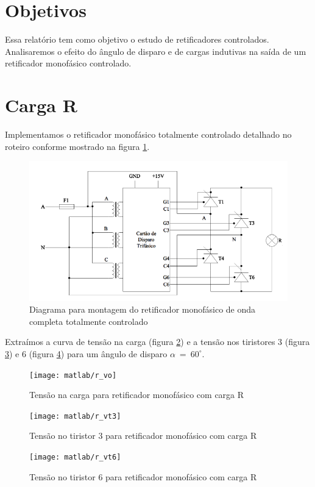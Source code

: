 \documentclass{report}
\begin{document}


\onehalfspacing
\section{Objetivos}
	Essa relatório tem como objetivo o estudo de retificadores controlados. Analisaremos o efeito do ângulo de disparo e de cargas indutivas na saída de um retificador monofásico controlado.
	 
\section{Carga R}
Implementamos o retificador monofásico totalmente controlado detalhado no roteiro conforme mostrado na figura \ref{fig:resq}.
\begin{figure}[H]
	\centering
	\includegraphics[width=\linewidth]{dados/resq}
	\caption{Diagrama para montagem do retificador monofásico de onda completa totalmente controlado}
	\label{fig:resq}
\end{figure}

Extraímos a curva de tensão na carga (figura \ref{fig:rvo}) e a tensão nos tiristores 3 (figura \ref{fig:rvt3}) e 6 (figura \ref{fig:rvt6}) para um ângulo de disparo $\alpha\ =\ 60^\circ$.
\begin{figure}[H]
	\centering
	\texttt{[image: matlab/r\_vo]}
	\caption{Tensão na carga para retificador monofásico com carga R}
	\label{fig:rvo}
\end{figure}
\begin{figure}[H]
	\centering
	\texttt{[image: matlab/r\_vt3]}
	\caption{Tensão no tiristor 3 para retificador monofásico com carga R}
	\label{fig:rvt3}
\end{figure}
\begin{figure}[H]
	\centering
	\texttt{[image: matlab/r\_vt6]}
	\caption{Tensão no tiristor 6 para retificador monofásico com carga R}
	\label{fig:rvt6}
\end{figure}
\end{document}
